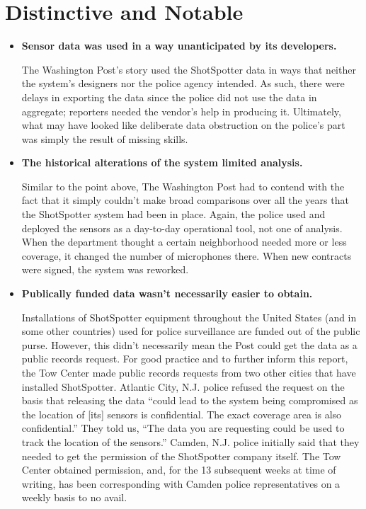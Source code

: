 \section{Distinctive and Notable}

\begin{itemize}
\item \textbf{Sensor data was used in a way unanticipated by its developers.}

The Washington Post's story used the ShotSpotter data in ways that
neither the system's designers nor the police agency intended. As such,
there were delays in exporting the data since the police did not use the
data in aggregate; reporters needed the vendor's help in producing it.
Ultimately, what may have looked like deliberate data obstruction on
the police's part was simply the result of missing skills.

\item \textbf{The historical alterations of the system limited analysis.}

Similar to the point above, The Washington Post had to contend with
the fact that it simply couldn't make broad comparisons over all the
years that the ShotSpotter system had been in place. Again, the police
used and deployed the sensors as a day-to-day operational tool, not
one of analysis. When the department thought a certain neighborhood
needed more or less coverage, it changed the number of microphones
there. When new contracts were signed, the system was reworked.

\item \textbf{Publically funded data wasn't necessarily easier to obtain.}

Installations of ShotSpotter equipment throughout the United States
(and in some other countries) used for police surveillance are funded
out of the public purse. However, this didn't necessarily mean the Post
could get the data as a public records request. For good practice and
to further inform this report, the Tow Center made public records
requests from two other cities that have installed ShotSpotter. Atlantic
City, N.J. police refused the request on the basis that releasing the
data ``could lead to the system being compromised as the location of
[its] sensors is confidential. The exact coverage area is also confidential.''
They told us, ``The data you are requesting could be used to track
the location of the sensors.'' Camden, N.J. police initially said that they
needed to get the permission of the ShotSpotter company itself. The
Tow Center obtained permission, and, for the 13 subsequent weeks at
time of writing, has been corresponding with Camden police representatives
on a weekly basis to no avail.


\end{itemize}
